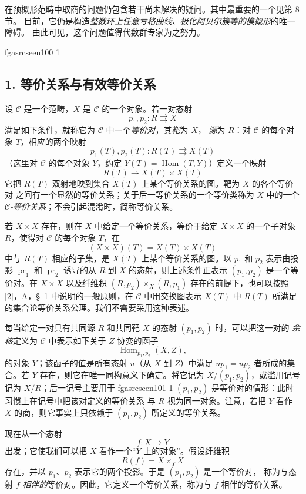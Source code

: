 \documentclass[12pt,twoside,openany]{book}
\numberwithin{equation}{section}
\newcommand{\fgaunitid}{unbound}
\newcommand{\src}[1]{%
  \phantomsection
  \hypertarget{src:\fgaunitid:#1}{}%
  \hypertarget{fga.\fgaunitid.p#1}{}%
  \ifcsname fgasrcseen#1\endcsname\else
    \expandafter\gdef\csname fgasrcseen#1\endcsname{1}%
    \hypertarget{src:#1}{}%
  \fi
  \marginpar{\raggedleft\footnotesize\sffamily #1}%
}
\theoremstyle{plain}
\theoremstyle{definition}
\theoremstyle{remark}
\begin{document}
在预概形范畴中取商的问题仍包含若干尚未解决的疑问。其中最重要的一个见第 8 节。
目前，它仍是构造\emph{整数环上任意亏格曲线、极化阿贝尔簇等的模概形}的唯一障碍。
由此可见，这个问题值得代数群专家为之努力。

\src{100}
\subsection*{1. 等价关系与有效等价关系}

设 $\mathcal C$ 是一个范畴，$X$ 是 $\mathcal C$ 的一个对象。若一对态射
\[
  p_1,p_2:R\rightrightarrows X
\]
满足如下条件，就称它为 $\mathcal C$ 中一个\emph{等价对}，其\emph{靶}为 $X$，
\emph{源}为 $R$：对 $\mathcal C$ 的每个对象 $T$，相应的两个映射
\[
  p_1(T),p_2(T):R(T)\rightrightarrows X(T)
\]
（这里对 $\mathcal C$ 的每个对象 $Y$，约定
$Y(T)=\operatorname{Hom}(T,Y)$）定义一个映射
\[
  R(T)\longrightarrow X(T)\times X(T)
\]
它把 $R(T)$ 双射地映到集合 $X(T)$ 上某个等价关系的图。靶为 $X$ 的各个等价对
之间有一个显然的等价关系；关于后一等价关系的一个等价类称为 $X$ 中的一个
\emph{$\mathcal C$-等价关系}；不会引起混淆时，简称等价关系。

若 $X\times X$ 存在，则在 $X$ 中给定一个等价关系，等价于给定
$X\times X$ 的一个子对象 $R$，使得对 $\mathcal C$ 的每个对象 $T$，在
\[
  (X\times X)(T)=X(T)\times X(T)
\]
中与 $R(T)$ 相应的子集，是 $X(T)$ 上某个等价关系的图。以 $p_1$ 和 $p_2$
表示由投影 $\operatorname{pr}_1$ 和 $\operatorname{pr}_2$ 诱导的从 $R$
到 $X$ 的态射，则上述条件正表示 $(p_1,p_2)$ 是一个等价对。在
$X\times X$ 以及纤维积 $(R,p_2)\times_X(R,p_1)$ 存在的前提下，也可以按照
[2]，A，\S~1 中说明的一般原则，在 $\mathcal C$ 中用交换图表示 $X(T)$ 中
$R(T)$ 所满足的集合论等价关系公理。我们不需要采用这种表述。

每当给定一对具有共同源 $R$ 和共同靶 $X$ 的态射 $(p_1,p_2)$ 时，可以把这一对的
\emph{余核}定义为 $\mathcal C$ 中表示如下关于 $Z$ 协变的函子
\[
  \operatorname{Hom}_{p_1,p_2}(X,Z),
\]
的对象 $Y$；该函子的值是所有态射 $u$（从 $X$ 到 $Z$）中满足
$up_1=up_2$ 者所成的集合。若 $Y$ 存在，则它在唯一同构意义下确定。将它记为
$X/(p_1,p_2)$，或滥用记号记为 $X/R$；后一记号主要用于
\src{101}$(p_1,p_2)$ 是等价对的情形：此时习惯上在记号中把该对定义的等价关系
与 $R$ 视为同一对象。注意，若把 $Y$ 看作 $X$ 的商，则它事实上只依赖于
$(p_1,p_2)$ 所定义的等价关系。

现在从一个态射
\[
  f:X\longrightarrow Y
\]
出发；它使我们可以把 $X$ 看作一个“$Y$ 上的对象”。假设纤维积
\[
  R(f)=X\times_Y X
\]
存在，并以 $p_1$、$p_2$ 表示它的两个投影。于是 $(p_1,p_2)$ 是一个等价对，
称为与态射 $f$ \emph{相伴的}等价对。因此，它定义一个等价关系，称为与 $f$
相伴的等价关系。
\end{document}
